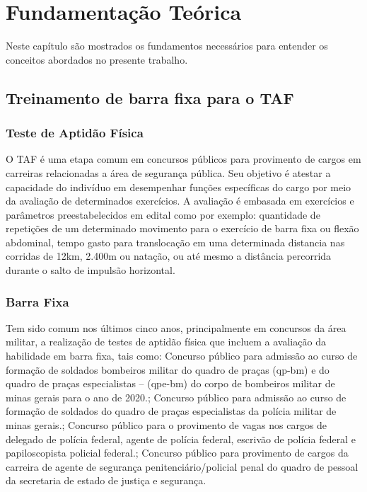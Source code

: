 \chapter{Fundamentação Teórica}
Neste capítulo são mostrados os fundamentos necessários para entender os conceitos abordados no presente trabalho.


\section[Treinamento de barra fixa para o TAF]{Treinamento de barra fixa para o TAF}\label{sec:Treinamento de barra fixa para o TAF}

\subsection[Teste de Aptidão Física]{Teste de Aptidão Física}\label{sec:Teste de Aptidão Física}
O \ac{TAF}  é uma etapa comum em concursos públicos para provimento de cargos em carreiras relacionadas a área de segurança pública. Seu objetivo é atestar a capacidade do indivíduo em desempenhar funções específicas do cargo por meio da avaliação de determinados exercícios. A avaliação é embasada em exercícios e parâmetros preestabelecidos em edital como por exemplo: quantidade de repetições de um determinado movimento para o exercício de barra fixa ou flexão abdominal, tempo gasto para translocação em uma determinada distancia nas corridas de 12km, 2.400m ou natação, ou até mesmo a distância percorrida durante o salto de impulsão horizontal\cite{TAF_adv}.


\subsection[Barra Fixa]{Barra Fixa}\label{sec:Barra Fixa}
Tem sido comum nos últimos cinco anos, principalmente em concursos da área militar, a realização de testes de aptidão física que incluem a avaliação da habilidade em barra fixa, tais como: Concurso público para admissão ao curso de formação de soldados bombeiros militar do quadro de praças (qp-bm) e do quadro de praças especialistas – (qpe-bm) do corpo de bombeiros militar de minas gerais para o ano de 2020.\cite{eCBMG2018}; Concurso público para admissão ao curso de formação de soldados do quadro de praças especialistas da polícia militar de minas gerais.\cite{ePMMG2021}; Concurso público para o provimento de vagas nos cargos de delegado de polícia federal, agente de polícia federal, escrivão de polícia federal e papiloscopista policial federal.\cite{ePF2021}; Concurso público para provimento de cargos da carreira de agente de segurança penitenciário/policial penal do quadro de pessoal da secretaria de estado de justiça e segurança\cite{ePP2021}.

